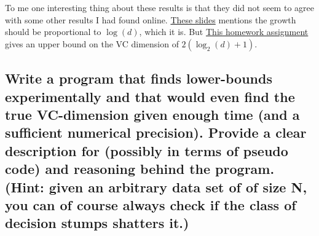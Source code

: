 \documentclass[11pt,a4paper]{article}
\begin{document}
To me one interesting thing about these results is that they did not seem to agree with some other results I had found online. \href{https://people.csail.mit.edu/alinush/6.867-fall-2013/2013.10.22.w8.tu-lecture-13-generalization-part-2.pdf}{These slides} mentions the growth should be proportional to $\log(d)$, which it is. But \href{http://courses.cms.caltech.edu/cs253/hw/hw2.pdf}{This homework assignment} gives an upper bound on the VC dimension of $2(\log_2(d) + 1)$. 

\subsection{Write a program that finds lower-bounds experimentally and that would even find the
true VC-dimension given enough time (and a sufficient numerical precision). Provide a
clear description for (possibly in terms of pseudo code) and reasoning behind the program.
(Hint: given an arbitrary data set of of size N, you can of course always check if the class
of decision stumps shatters it.)}





\end{document}
